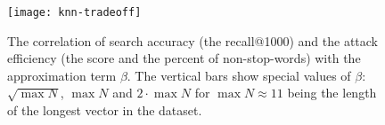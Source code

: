 \begin{figure}[h]
	\centering
	\texttt{[image: knn-tradeoff]} %
	\caption[The correlation of search accuracy and the attack efficiency with $\beta$]{
		The correlation of search accuracy (the {\color{MatplotlibThree}recall@1000}) and the attack efficiency (the {\color{MatplotlibOne}\FOne{} score} and the {\color{MatplotlibTwo}percent of non-stop-words}) with the approximation term $\beta$.
		The {\color{magenta}vertical bars} show special values of $\beta$: $\sqrt{\max N}$, $\max N$ and $2 \cdot \max N$ for $\max N \approx 11$ being the length of the longest vector in the dataset.
	}\label{figure:knn-tradeoff}
\end{figure}
